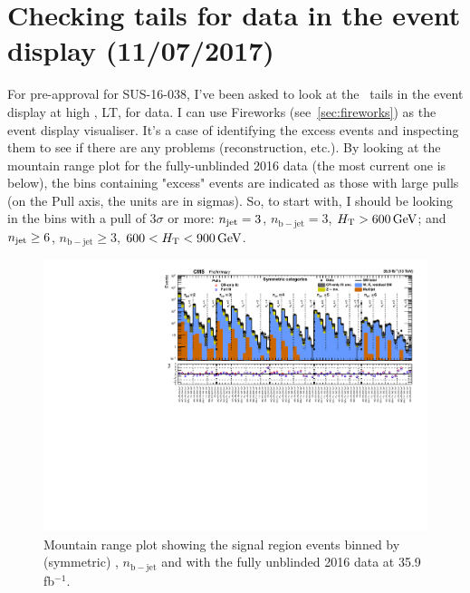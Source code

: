 \newpage
\chapter{Checking \texorpdfstring{\htmiss}{HTmiss} tails for data in the event display (11/07/2017)}

For pre-approval for SUS-16-038, I've been asked to look at the \htmiss\ tails in the event display at high \HT, LT, for data. I can use Fireworks (see~\ref{sec:fireworks}) as the event display visualiser. It's a case of identifying the excess events and inspecting them to see if there are any problems (reconstruction, etc.). By looking at the mountain range plot for the fully-unblinded 2016 data (the most current one is below), the bins containing "excess" events are indicated as those with large pulls (on the Pull axis, the units are in sigmas). So, to start with, I should be looking in the bins with a pull of 3$\sigma$ or more: $n_{\mathrm{jet}} = 3$, $n_{\mathrm{b-jet}} = 3$, $H_{\mathrm{T}} > 600\,\text{G\text{e\kern-0.15ex V}}$; and $n_{\mathrm{jet}} \geq 6$, $n_{\mathrm{b-jet}} \geq 3$, $600 < H_{\mathrm{T}} < 900\,\text{G\text{e\kern-0.15ex V}}$.

\begin{figure}[H]
\centering
\includegraphics[width=\textwidth]{./sec27/summaryPlot_Symmetric_prefit_overlay_fit_b.pdf}
\caption{Mountain range plot showing the signal region events binned by (symmetric) \njet, $n_{\mathrm{b-jet}}$ and \HT with the fully unblinded 2016 data at 35.9 fb$^{-1}$. }
\end{figure}

